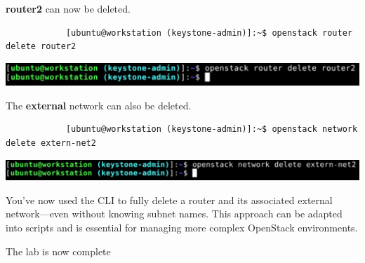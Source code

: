 \documentclass[letterpaper, 12pt]{article}
\begin{document}
\begin{enumerate}
    \begin{labstep}
        \textbf{router2} can now be deleted.
        \begin{lstlisting}
            [ubuntu@workstation (keystone-admin)]:~$ openstack router delete router2
        \end{lstlisting}

        \begin{center}
            \includegraphics[width=\linewidth]{images/part4/step9.png}
        \end{center}
    \end{labstep}

    \begin{labstep}
        The \textbf{external} network can also be deleted.
        \begin{lstlisting}
            [ubuntu@workstation (keystone-admin)]:~$ openstack network delete extern-net2
        \end{lstlisting}

        \begin{center}
            \includegraphics[width=\linewidth]{images/part4/step10.png}
        \end{center}
    \end{labstep}

    \begin{notebox}
        You've now used the CLI to fully delete a router and its associated external network---even without knowing subnet names.
        This approach can be adapted into scripts and is essential for managing more complex OpenStack environments.
    \end{notebox}

    \begin{labstep}
        The lab is now complete
    \end{labstep}

\end{enumerate}
\end{document}
